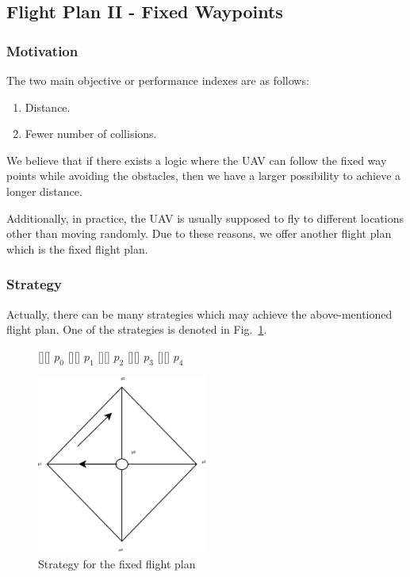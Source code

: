 \subsection{Flight Plan II - Fixed Waypoints}


\subsubsection{Motivation}
The two main objective or performance indexes are as follows:
\begin{enumerate}
\item Distance.
\item Fewer number of collisions.
\end{enumerate}

We believe that if there exists a logic where the \ac{UAV} can follow the fixed way points while avoiding the obstacles, then we have a larger possibility to achieve a longer distance. 

Additionally, in practice, the \ac{UAV} is usually supposed to fly to different locations other than moving randomly. Due to these reasons, we offer another flight plan which is the fixed flight plan.


\subsubsection{Strategy}
Actually, there can be many strategies which may achieve the above-mentioned flight plan. One of the strategies is denoted in Fig.~\ref{f:fp}.

\begin{figure}
\centering
{} 		[][]  {$p_0$}
 		[][]  {$p_1$}
 		[][]  {$p_2$}
 		[][]  {$p_3$}
 		[][]  {$p_4$}

\includegraphics[width= 0.5\textwidth]{Figures/fp.eps}
\caption{Strategy for the fixed flight plan}
\label{f:fp}
\end{figure}


